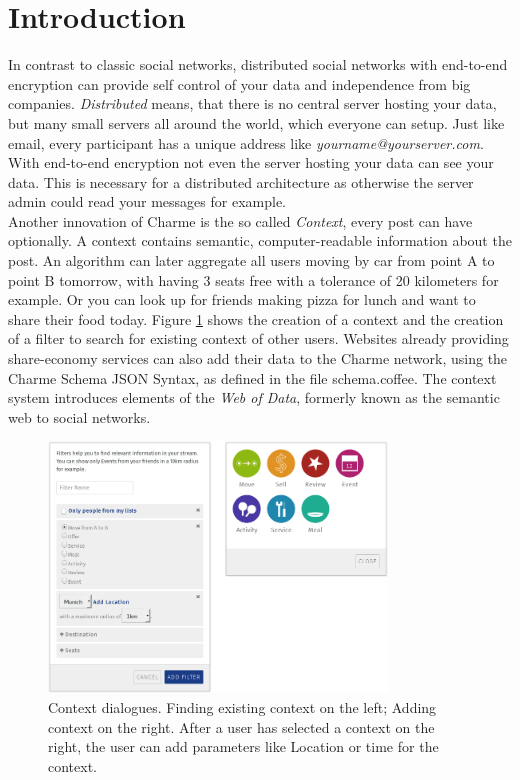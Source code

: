 \documentclass{scrartcl}
\begin{document}
\newpage
\section{Introduction}
In contrast to classic social networks, distributed social networks with end-to-end encryption can provide self control of your data and  independence from big companies.  \textit{Distributed} means, that there is no central server hosting your data, but many small servers all around the world, which everyone can  setup. Just like email, every participant has a unique address like \textit{yourname@yourserver.com}. With end-to-end encryption not even the server hosting your data can see your data. This is necessary for a distributed architecture as otherwise the server admin could read your messages for example.\\

Another innovation of Charme is the so called \textit{Context}, every post can have optionally. A context contains semantic, computer-readable information about the post.
 An algorithm can later aggregate all users moving by car from point A to point B tomorrow, with having 3 seats free with a tolerance of 20 kilometers for example. Or you can look up for friends making pizza for lunch and want to share their food today. Figure \ref{figContext} shows the creation of a context and the creation of a filter to search for existing context of other users. 
 Websites already providing share-economy services can also add their data to the Charme network, using the Charme Schema JSON Syntax, as defined in the file schema.coffee. The context system introduces elements of the \textit{Web of Data}, formerly known as the semantic web to social networks.

\begin{figure}[ht]
	\centering
  \includegraphics[width=90mm]{illustrations/context.jpg}
	\caption{Context dialogues. Finding existing context on the left; Adding context on the right. After a user has selected a context on the right, the user can add parameters like Location or time for the context.}
	\label{figContext}
\end{figure}
\newpage
\end{document}
